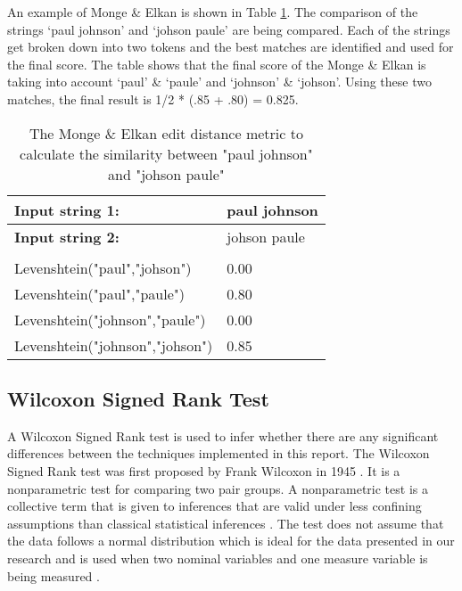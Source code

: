 An example of Monge \& Elkan is shown in Table \ref{mongeTable}. The comparison of the strings `paul johnson' and `johson paule' are being compared. Each of the strings get broken down into two tokens and the best matches are identified and used for the final score. The table shows that the final score of the Monge \& Elkan is taking into account `paul' \& `paule' and `johnson' \& `johson'. Using these two matches, the final result is 1/2 * (.85 + .80) = 0.825.

\begin{table}[H]
\centering

\begin{tabular}{|l|l|}
\hline
\textbf{Input string 1:}        & paul johnson \\ \hline
\textbf{Input string 2:}        & johson paule \\ \hline
                                &              \\ \hline
Levenshtein("paul","johson")    & 0.00         \\ \hline
Levenshtein("paul","paule")     & 0.80         \\ \hline
Levenshtein("johnson","paule")  & 0.00         \\ \hline
Levenshtein("johnson","johson") & 0.85         \\ \hline
\end{tabular}
\caption{The Monge \& Elkan edit distance metric to calculate the similarity between "paul johnson" and "johson paule"}
\label{mongeTable}
\end{table}



\subsection{Wilcoxon Signed Rank Test}

A Wilcoxon Signed Rank test is used to infer whether there are any significant differences between the techniques implemented in this report. The Wilcoxon Signed Rank test was first proposed by Frank Wilcoxon in 1945 \cite{wilcoxon1945individual}. It is a nonparametric test for comparing two pair groups. A nonparametric test is a collective term that is given to inferences that are valid under less confining assumptions than classical statistical inferences \cite{nonparametric}. The test does not assume that the data follows a normal distribution which is ideal for the data presented in our research and is used when two nominal variables and one measure variable is being measured \cite{mcdonald2009handbook}.

